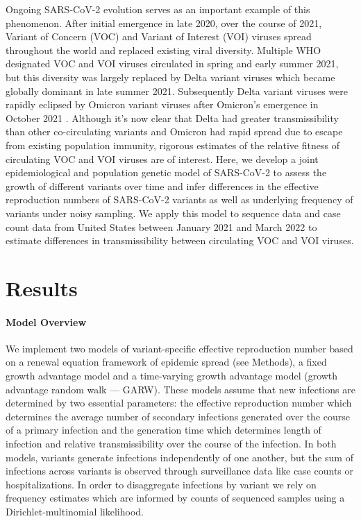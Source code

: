 \documentclass[11pt,oneside,letterpaper]{article}
\begin{document}
Ongoing SARS-CoV-2 evolution serves as an important example of this phenomenon.
After initial emergence in late 2020, over the course of 2021, Variant of Concern (VOC) and Variant of Interest (VOI) viruses spread throughout the world and replaced existing viral diversity.
Multiple WHO designated \cite{Konings2021} VOC and VOI viruses circulated in spring and early summer 2021, but this diversity was largely replaced by Delta variant viruses which became globally dominant in late summer 2021.
Subsequently Delta variant viruses were rapidly eclipsed by Omicron variant viruses after Omicron's emergence in October 2021 \cite{viana2022rapid}.
Although it's now clear that Delta had greater transmissibility than other co-circulating variants and Omicron had rapid spread due to escape from existing population immunity, rigorous estimates of the relative fitness of circulating VOC and VOI viruses are of interest.
Here, we develop a joint epidemiological and population genetic model of SARS-CoV-2 to assess the growth of different variants over time and infer differences in the effective reproduction numbers of SARS-CoV-2 variants as well as underlying frequency of variants under noisy sampling.
We apply this model to sequence data and case count data from United States between January 2021 and March 2022 to estimate differences in transmissibility between circulating VOC and VOI viruses.

\section*{Results}

\paragraph{Model Overview}%

We implement two models of variant-specific effective reproduction number based on a renewal equation framework of epidemic spread (see Methods), a fixed growth advantage model and a time-varying growth advantage model (growth advantage random walk --- GARW).
These models assume that new infections are determined by two essential parameters: the effective reproduction number which determines the average number of secondary infections generated over the course of a primary infection and the generation time which determines length of infection and relative transmissibility over the course of the infection.
In both models, variants generate infections independently of one another, but the sum of infections across variants is observed through surveillance data like case counts or hospitalizations.
In order to disaggregate infections by variant we rely on frequency estimates which are informed by counts of sequenced samples using a Dirichlet-multinomial likelihood.
\end{document}
